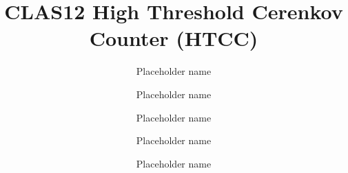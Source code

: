 \title{CLAS12 High Threshold Cerenkov Counter (HTCC)}

\author[1]{Placeholder name}
\author[2]{Placeholder name}
\author[3]{Placeholder name}
\author[4]{Placeholder name}
\author[5]{Placeholder name}

\address[1]{Placeholder location}
\address[2]{Placeholder location}
\address[3]{Placeholder location}
\address[4]{Placeholder location}
\address[5]{Placeholder location}